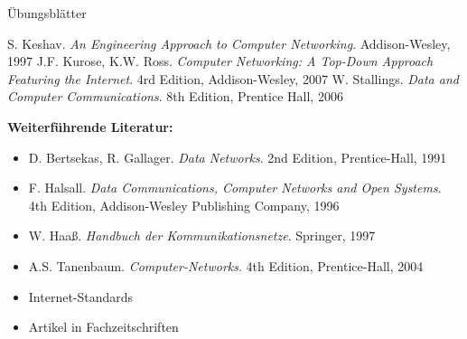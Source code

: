 \begin{course}
\begin{content}
\end{content}

\begin{media}Übungsblätter

\end{media}

\begin{literature}S. Keshav. \emph{An Engineering Approach to Computer Networking}. Addison-Wesley, 1997\newline
J.F. Kurose, K.W. Ross. \emph{Computer Networking: A Top-Down Approach Featuring the Internet}. 4rd Edition, Addison-Wesley, 2007\newline
W. Stallings. \emph{Data and Computer Communications}. 8th Edition, Prentice Hall, 2006

 

\textbf{Weiterführende Literatur:}

 \begin{itemize}\item D. Bertsekas, R. Gallager. \emph{Data Networks}. 2nd Edition, Prentice-Hall, 1991  \item F. Halsall. \emph{Data Communications, Computer Networks and Open Systems}. 4th Edition, Addison-Wesley Publishing Company, 1996  \item W. Haaß. \emph{Handbuch der Kommunikationsnetze}. Springer, 1997  \item A.S. Tanenbaum. \emph{Computer-Networks}. 4th Edition, Prentice-Hall, 2004  \item Internet-Standards  \item Artikel in Fachzeitschriften  \end{itemize}\end{literature}



\end{course}
